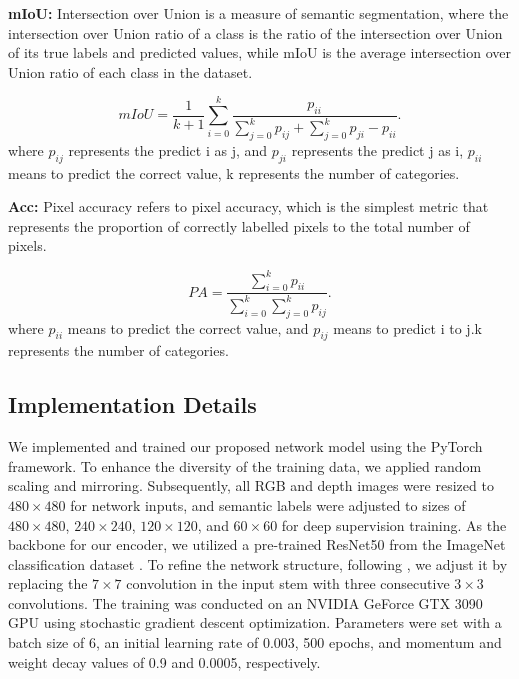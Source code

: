 \documentclass{aims}
\numberwithin{equation}{section}
\begin{document}
{\bfseries mIoU:} Intersection over Union is a measure of semantic segmentation, where the intersection over Union ratio of a class is the ratio of the intersection over Union of its true labels and predicted values, while mIoU is the average intersection over Union ratio of each class in the dataset.

\begin{equation}
\label{eq15}
	mIoU= \dfrac{1}{k+1} \sum_{i=0}^{k}\frac{{p}_{ii}}{\sum_{j=0}^{k}{p}_{ij}+\sum_{j=0}^{k}{p}_{ji}-{p}_{ii}}.
\end{equation}
where ${p}_{ij}$ represents the predict i as j, and ${p}_{ji}$ represents the predict j as i, ${p}_{ii}$ means to predict the correct value, k represents the number of categories.

{\bfseries Acc:} Pixel accuracy refers to pixel accuracy, which is the simplest metric that represents the proportion of correctly labelled pixels to the total number of pixels.

\begin{equation}
\label{eq16}
	PA=\dfrac{\sum_{i=0}^{k}{p}_{ii}}{\sum_{i=0}^{k}\sum_{j=0}^{k}{p}_{ij}}.
\end{equation}
where ${p}_{ii}$ means to predict the correct value, and ${p}_{ij}$ means to predict i to j.k represents the number of categories.
 
\subsection{Implementation Details}

We implemented and trained our proposed network model using the PyTorch framework. To enhance the diversity of the training data, we applied random scaling and mirroring. Subsequently, all RGB and depth images were resized to $480\times480$ for network inputs, and semantic labels were adjusted to sizes of $480\times480$, $240\times240$, $120\times120$, and $60\times60$ for deep supervision training. As the backbone for our encoder, we utilized a pre-trained ResNet50 \cite{he2016deep} from the ImageNet classification dataset \cite{russakovsky2015imagenet}. To refine the network structure, following \cite{fu2022bag, shen2021competitive, shen2022competitive},  we adjust it by replacing the $7\times7$ convolution in the input stem with three consecutive $3\times3$ convolutions. The training was conducted on an NVIDIA GeForce GTX 3090 GPU using stochastic gradient descent optimization. Parameters were set with a batch size of 6, an initial learning rate of 0.003, 500 epochs, and momentum and weight decay values of 0.9 and 0.0005, respectively.
\end{document}
